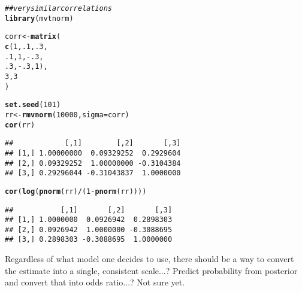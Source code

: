 \documentclass{article}\usepackage[]{graphicx}\usepackage[]{color}
\makeatletter
\newcommand{\hlnum}[1]{\textcolor[rgb]{0.686,0.059,0.569}{#1}}%
\newcommand{\hlcom}[1]{\textcolor[rgb]{0.678,0.584,0.686}{\textit{#1}}}%
\newcommand{\hlopt}[1]{\textcolor[rgb]{0,0,0}{#1}}%
\newcommand{\hlstd}[1]{\textcolor[rgb]{0.345,0.345,0.345}{#1}}%
\newcommand{\hlkwb}[1]{\textcolor[rgb]{0.69,0.353,0.396}{#1}}%
\newcommand{\hlkwc}[1]{\textcolor[rgb]{0.333,0.667,0.333}{#1}}%
\newcommand{\hlkwd}[1]{\textcolor[rgb]{0.737,0.353,0.396}{\textbf{#1}}}%
\newenvironment{kframe}{%
 \def\at@end@of@kframe{}%
 \ifinner\ifhmode%
  \def\at@end@of@kframe{\end{minipage}}%
  \begin{minipage}{\columnwidth}%
 \fi\fi%
 \def\FrameCommand##1{\hskip\@totalleftmargin \hskip-\fboxsep
 \colorbox{shadecolor}{##1}\hskip-\fboxsep
     \hskip-\linewidth \hskip-\@totalleftmargin \hskip\columnwidth}%
 \MakeFramed {\advance\hsize-\width
   \@totalleftmargin\z@ \linewidth\hsize
   \@setminipage}}%
 {\par\unskip\endMakeFramed%
 \at@end@of@kframe}
\newenvironment{knitrout}{}{} %
\makeatother
\begin{document}
\begin{knitrout}
\color{fgcolor}\begin{kframe}
\begin{alltt}
\hlcom{## very similar correlations}
\hlkwd{library}\hlstd{(mvtnorm)}
\end{alltt}


{\ttfamily\noindent\color{warningcolor}{\#\# Warning: package 'mvtnorm' was built under R version 3.5.2}}

{\ttfamily\noindent\itshape\color{messagecolor}{\#\# \\\#\# Attaching package: 'mvtnorm'}}

{\ttfamily\noindent\itshape\color{messagecolor}{\#\# The following object is masked from 'package:emdbook':\\\#\# \\\#\#\ \ \ \  dmvnorm}}\begin{alltt}
\hlstd{corr} \hlkwb{<-} \hlkwd{matrix}\hlstd{(}
        \hlkwd{c}\hlstd{(}\hlnum{1}\hlstd{,} \hlnum{.1}\hlstd{,} \hlnum{.3}\hlstd{,}
          \hlnum{.1}\hlstd{,} \hlnum{1}\hlstd{,} \hlopt{-}\hlnum{.3}\hlstd{,}
          \hlnum{.3}\hlstd{,} \hlopt{-}\hlnum{.3}\hlstd{,} \hlnum{1}\hlstd{),}
        \hlnum{3}\hlstd{,} \hlnum{3}
\hlstd{)}

\hlkwd{set.seed}\hlstd{(}\hlnum{101}\hlstd{)}
\hlstd{rr} \hlkwb{<-} \hlkwd{rmvnorm}\hlstd{(}\hlnum{10000}\hlstd{,} \hlkwc{sigma}\hlstd{=corr)}
\hlkwd{cor}\hlstd{(rr)}
\end{alltt}
\begin{verbatim}
##            [,1]        [,2]       [,3]
## [1,] 1.00000000  0.09329252  0.2929604
## [2,] 0.09329252  1.00000000 -0.3104384
## [3,] 0.29296044 -0.31043837  1.0000000
\end{verbatim}
\begin{alltt}
\hlkwd{cor}\hlstd{(}\hlkwd{log}\hlstd{(}\hlkwd{pnorm}\hlstd{(rr)}\hlopt{/}\hlstd{(}\hlnum{1} \hlopt{-} \hlkwd{pnorm}\hlstd{(rr))))}
\end{alltt}
\begin{verbatim}
##           [,1]       [,2]       [,3]
## [1,] 1.0000000  0.0926942  0.2898303
## [2,] 0.0926942  1.0000000 -0.3088695
## [3,] 0.2898303 -0.3088695  1.0000000
\end{verbatim}
\end{kframe}
\end{knitrout}

Regardless of what model one decides to use, there should be a way to convert the estimate into a single, consistent scale...? Predict probability from posterior and convert that into odds ratio...? Not sure yet.




\end{document}

